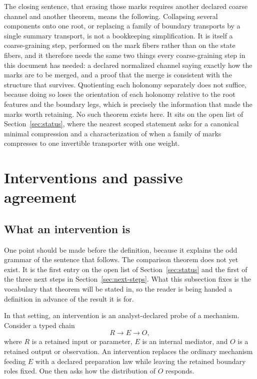 \documentclass[11pt,letterpaper]{article}
\begin{document}
The closing sentence, that erasing those marks requires another declared coarse channel and another theorem, means the following. Collapsing several components onto one root, or replacing a family of boundary transports by a single summary transport, is not a bookkeeping simplification. It is itself a coarse-graining step, performed on the mark fibers rather than on the state fibers, and it therefore needs the same two things every coarse-graining step in this document has needed: a declared normalized channel saying exactly how the marks are to be merged, and a proof that the merge is consistent with the structure that survives. Quotienting each holonomy separately does not suffice, because doing so loses the orientation of each holonomy relative to the root features and the boundary legs, which is precisely the information that made the marks worth retaining. No such theorem exists here. It sits on the open list of Section~\ref{sec:status}, where the nearest scoped statement asks for a canonical minimal compression and a characterization of when a family of marks compresses to one invertible transporter with one weight.

\section{Interventions and passive agreement}

\subsection{What an intervention is}
\label{sec:intervention}

One point should be made before the definition, because it explains the odd grammar of the sentence that follows. The comparison theorem does not yet exist. It is the first entry on the open list of Section~\ref{sec:status} and the first of the three next steps in Section~\ref{sec:next-steps}. What this subsection fixes is the vocabulary that theorem will be stated in, so the reader is being handed a definition in advance of the result it is for.

In that setting, an intervention is an analyst-declared probe of a mechanism. Consider a typed chain
\[
  R\longrightarrow E\longrightarrow O,
\]
where \(R\) is a retained input or parameter, \(E\) is an internal mediator, and \(O\) is a retained output or observation. An intervention replaces the ordinary mechanism feeding \(E\) with a declared preparation law while leaving the retained boundary roles fixed. One then asks how the distribution of \(O\) responds.
\end{document}
